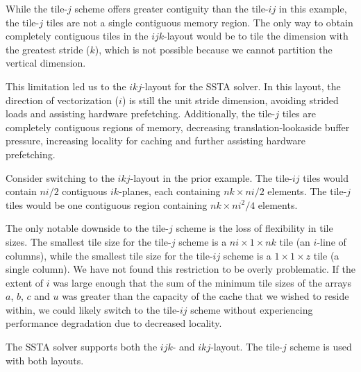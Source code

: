 \documentclass{sig-alternate-05-2015}
\begin{document}
While the tile-\(j\) scheme offers greater contiguity than the
  tile-\(ij\) in this example, the tile-\(j\) tiles are not a single contiguous
  memory region.
The only way to obtain completely contiguous tiles in the \(ijk\)-layout would
  be to tile the dimension with the greatest stride (\(k\)), which is not possible
  because we cannot partition the vertical dimension.

This limitation led us to the \(ikj\)-layout for the SSTA solver.
In this layout, the direction of vectorization (\(i\)) is still the unit stride
  dimension, avoiding strided loads and assisting hardware prefetching.
Additionally, the tile-\(j\) tiles are completely contiguous regions of memory,
  decreasing translation-lookaside buffer pressure, increasing locality for
  caching and further assisting hardware prefetching.

Consider switching to the \(ikj\)-layout in the prior example.
The tile-\(ij\) tiles would contain \(ni/2\) contiguous \(ik\)-planes, each
  containing \(nk \times ni/2\) elements.
The tile-\(j\) tiles would be one contiguous region containing
  \(nk \times ni^2/4\) elements.


The only notable downside to the tile-\(j\) scheme is the loss of
  flexibility in tile sizes.
The smallest tile size for the tile-\(j\) scheme is a \(ni \times 1 \times nk\)
  tile (an \(i\)-line of columns), while the smallest tile size for the
  tile-\(ij\) scheme is a \(1 \times 1 \times z\) tile (a single column).
We have not found this restriction to be overly problematic.
If the extent of \(i\) was large enough that the sum of the minimum tile sizes of
  the arrays \(a\), \(b\), \(c\) and \(u\) was greater than the capacity of the
  cache that we wished to reside within, we could likely switch to the tile-\(ij\)
  scheme without experiencing performance degradation due to decreased locality.

The SSTA solver supports both the \(ijk\)- and \(ikj\)-layout.
The tile-\(j\) scheme is used with both layouts.
\end{document}
